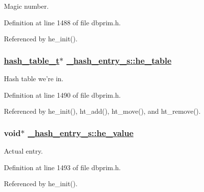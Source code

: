 Magic number. 

Definition at line 1488 of file dbprim.h.

Referenced by he\_\-init().\hypertarget{struct__hash__entry__s_o2}{
\subsubsection[he\_\-table]{\setlength{\rightskip}{0pt plus 5cm}\hyperlink{struct__hash__table__s}{hash\_\-table\_\-t}$\ast$ \hyperlink{struct__hash__entry__s_o2}{\_\-hash\_\-entry\_\-s::he\_\-table}}}
\label{struct__hash__entry__s_o2}


Hash table we're in. 

Definition at line 1490 of file dbprim.h.

Referenced by he\_\-init(), ht\_\-add(), ht\_\-move(), and ht\_\-remove().\hypertarget{struct__hash__entry__s_o5}{
\subsubsection[he\_\-value]{\setlength{\rightskip}{0pt plus 5cm}void$\ast$ \hyperlink{struct__hash__entry__s_o5}{\_\-hash\_\-entry\_\-s::he\_\-value}}}
\label{struct__hash__entry__s_o5}


Actual entry. 

Definition at line 1493 of file dbprim.h.

Referenced by he\_\-init().